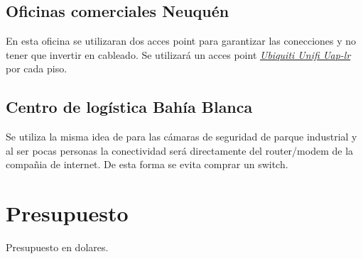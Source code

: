 \documentclass[11pt]{article}
\begin{document}
 



    \subsection{Oficinas comerciales Neuquén}

    En esta oficina se utilizaran dos acces point para garantizar las conecciones y no tener que invertir en cableado. Se utilizará un acces point 
    \href{https://www.mercadolibre.com.ar/access-point-interior-ubiquiti-networks-unifi-ac-lr-ap-uap-ac-lr-blanco-1-unidad/p/MLA7953376?pdp_filters=category:MLA1700#searchVariation=MLA7953376&position=1&type=product&tracking_id=933ff74a-93c5-4a58-9a31-9fe5a3c5746e}{\textit{Ubiquiti Unifi Uap-lr}}
    por cada piso.

    \subsection{Centro de logística Bahía Blanca}
    Se utiliza la misma idea de para las cámaras de seguridad de parque industrial y al ser pocas personas la conectividad será directamente del router/modem 
    de la compañia de internet. De esta forma se evita comprar un switch. 


    \section{Presupuesto}

    \begin{table}
        \centering
        
        \caption{Presupuesto en dolares.}
    \end{table}

    
\end{document}
